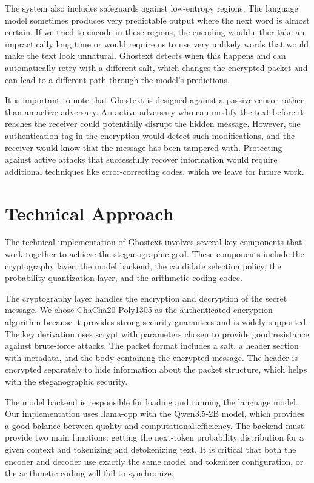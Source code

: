 \documentclass[sigconf,review,anonymous]{acmart}
\begin{document}
The system also includes safeguards against low-entropy regions. The language model sometimes produces very predictable output where the next word is almost certain. If we tried to encode in these regions, the encoding would either take an impractically long time or would require us to use very unlikely words that would make the text look unnatural. Ghostext detects when this happens and can automatically retry with a different salt, which changes the encrypted packet and can lead to a different path through the model's predictions.

It is important to note that Ghostext is designed against a passive censor rather than an active adversary. An active adversary who can modify the text before it reaches the receiver could potentially disrupt the hidden message. However, the authentication tag in the encryption would detect such modifications, and the receiver would know that the message has been tampered with. Protecting against active attacks that successfully recover information would require additional techniques like error-correcting codes, which we leave for future work.

\section{Technical Approach}

The technical implementation of Ghostext involves several key components that work together to achieve the steganographic goal. These components include the cryptography layer, the model backend, the candidate selection policy, the probability quantization layer, and the arithmetic coding codec.

The cryptography layer handles the encryption and decryption of the secret message. We chose ChaCha20-Poly1305 as the authenticated encryption algorithm because it provides strong security guarantees and is widely supported. The key derivation uses scrypt with parameters chosen to provide good resistance against brute-force attacks. The packet format includes a salt, a header section with metadata, and the body containing the encrypted message. The header is encrypted separately to hide information about the packet structure, which helps with the steganographic security.

The model backend is responsible for loading and running the language model. Our implementation uses llama-cpp with the Qwen3.5-2B model, which provides a good balance between quality and computational efficiency. The backend must provide two main functions: getting the next-token probability distribution for a given context and tokenizing and detokenizing text. It is critical that both the encoder and decoder use exactly the same model and tokenizer configuration, or the arithmetic coding will fail to synchronize.
\end{document}
